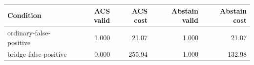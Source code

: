 \begin{tabular}{lrrrr}
\toprule
Condition & ACS valid & ACS cost & Abstain valid & Abstain cost \\
\midrule
ordinary-false-positive & 1.000 & 21.07 & 1.000 & 21.07 \\
bridge-false-positive & 0.000 & 255.94 & 1.000 & 132.98 \\
\bottomrule
\end{tabular}

